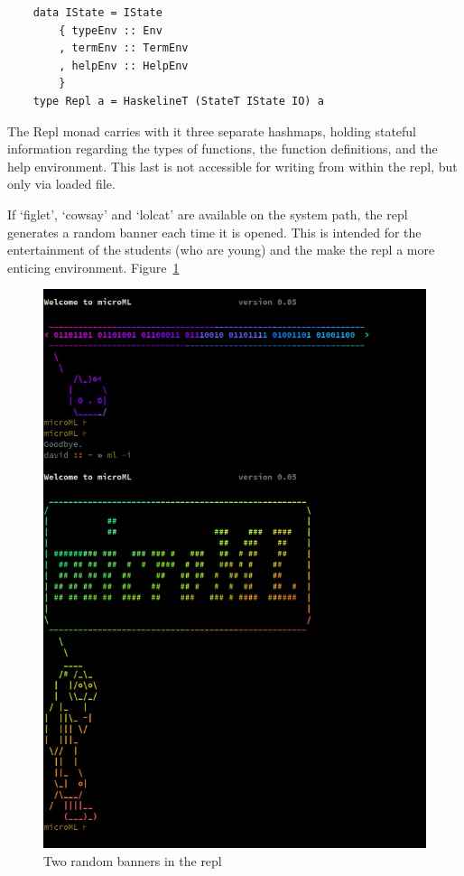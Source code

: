 \documentclass[12pt, a4paper]{report}
\begin{document}
\begin{verbatim}
    data IState = IState
        { typeEnv :: Env
        , termEnv :: TermEnv
        , helpEnv :: HelpEnv
        }
    type Repl a = HaskelineT (StateT IState IO) a
\end{verbatim}

The Repl monad carries with it three separate hashmaps, holding stateful information regarding the
types of functions, the function definitions, and the help environment. This last is not accessible
for writing from within the repl, but only via loaded file.

If `figlet', `cowsay' and `lolcat' are available on the system path, the repl generates a random
banner each time it is opened. This is intended for the entertainment of the students (who are
young) and the make the repl a more enticing environment. Figure~\ref{fig:banner}

\begin{figure}
    \includegraphics[width=\textwidth]{images/randomBanner.jpg}
    \caption{Two random banners in the repl}
\label{fig:banner}
\end{figure}
\end{document}
